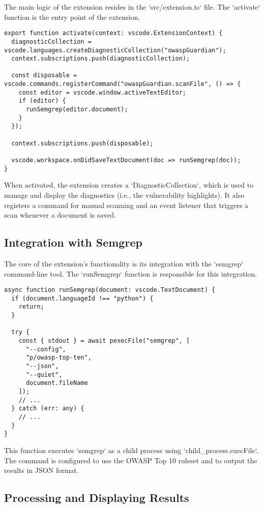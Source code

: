The main logic of the extension resides in the `src/extension.ts` file. The `activate` function is the entry point of the extension.

\begin{verbatim}
export function activate(context: vscode.ExtensionContext) {
  diagnosticCollection = vscode.languages.createDiagnosticCollection("owaspGuardian");
  context.subscriptions.push(diagnosticCollection);

  const disposable = vscode.commands.registerCommand("owaspGuardian.scanFile", () => {
    const editor = vscode.window.activeTextEditor;
    if (editor) {
      runSemgrep(editor.document);
    }
  });

  context.subscriptions.push(disposable);

  vscode.workspace.onDidSaveTextDocument(doc => runSemgrep(doc));
}
\end{verbatim}

When activated, the extension creates a `DiagnosticCollection`, which is used to manage and display the diagnostics (i.e., the vulnerability highlights). It also registers a command for manual scanning and an event listener that triggers a scan whenever a document is saved.

\subsection{Integration with Semgrep}

The core of the extension's functionality is its integration with the `semgrep` command-line tool. The `runSemgrep` function is responsible for this integration.

\begin{verbatim}
async function runSemgrep(document: vscode.TextDocument) {
  if (document.languageId !== "python") {
    return;
  }

  try {
    const { stdout } = await pexecFile("semgrep", [
      "--config",
      "p/owasp-top-ten",
      "--json",
      "--quiet",
      document.fileName
    ]);
    // ...
  } catch (err: any) {
    // ...
  }
}
\end{verbatim}

This function executes `semgrep` as a child process using `child\_process.execFile`. The command is configured to use the OWASP Top 10 ruleset and to output the results in JSON format.

\subsection{Processing and Displaying Results}

